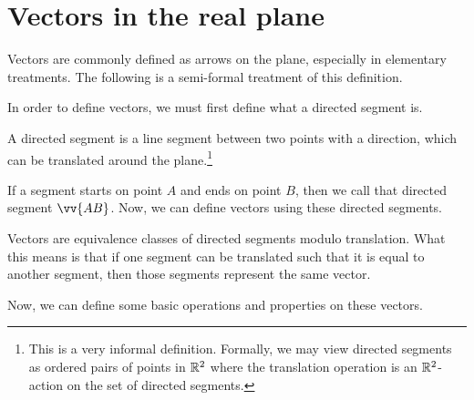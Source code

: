 
\section{Vectors in the real plane}

Vectors are commonly defined as arrows on the plane, especially in elementary treatments. The following is a semi-formal treatment of this definition.

In order to define vectors, we must first define what a directed segment is.

\begin{definition}
    A directed segment is a line segment between two points with a direction, which can be translated around the plane.\footnote{This is a very informal definition. Formally, we may view directed segments as ordered pairs of points in $\mathbb R^2$ where the translation operation is an $\mathbb R^2$-action on the set of directed segments.}
\end{definition}

If a segment starts on point $A$ and ends on point $B$, then we call that directed segment $\vv{AB}$. Now, we can define vectors using these directed segments.

\begin{definition}[Vector]
    Vectors are equivalence classes of directed segments modulo translation. What this means is that if one segment can be translated such that it is equal to another segment, then those segments represent the same vector.
\end{definition}

Now, we can define some basic operations and properties on these vectors.

